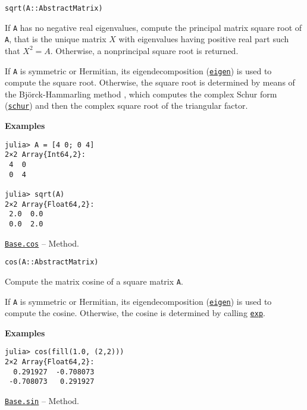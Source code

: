 \begin{adjustwidth}{2em}{0pt}


\begin{verbatim}
sqrt(A::AbstractMatrix)
\end{verbatim}

If \texttt{A} has no negative real eigenvalues, compute the principal matrix square root of \texttt{A}, that is the unique matrix \(X\) with eigenvalues having positive real part such that \(X^2 = A\). Otherwise, a nonprincipal square root is returned.

If \texttt{A} is symmetric or Hermitian, its eigendecomposition (\hyperlink{11056016707394839114}{\texttt{eigen}}) is used to compute the square root. Otherwise, the square root is determined by means of the Björck-Hammarling method \footnotemark[11], which computes the complex Schur form (\hyperlink{17132870828407138368}{\texttt{schur}}) and then the complex square root of the triangular factor.

\textbf{Examples}


\begin{verbatim}
julia> A = [4 0; 0 4]
2×2 Array{Int64,2}:
 4  0
 0  4

julia> sqrt(A)
2×2 Array{Float64,2}:
 2.0  0.0
 0.0  2.0
\end{verbatim}



\end{adjustwidth}
\hypertarget{18135909070173873711}{} 
\hyperlink{18135909070173873711}{\texttt{Base.cos}}  -- {Method.}

\begin{adjustwidth}{2em}{0pt}


\begin{verbatim}
cos(A::AbstractMatrix)
\end{verbatim}

Compute the matrix cosine of a square matrix \texttt{A}.

If \texttt{A} is symmetric or Hermitian, its eigendecomposition (\hyperlink{11056016707394839114}{\texttt{eigen}}) is used to compute the cosine. Otherwise, the cosine is determined by calling \hyperlink{5801729597955756107}{\texttt{exp}}.

\textbf{Examples}


\begin{verbatim}
julia> cos(fill(1.0, (2,2)))
2×2 Array{Float64,2}:
  0.291927  -0.708073
 -0.708073   0.291927
\end{verbatim}



\end{adjustwidth}
\hypertarget{17809044928122118326}{} 
\hyperlink{17809044928122118326}{\texttt{Base.sin}}  -- {Method.}

